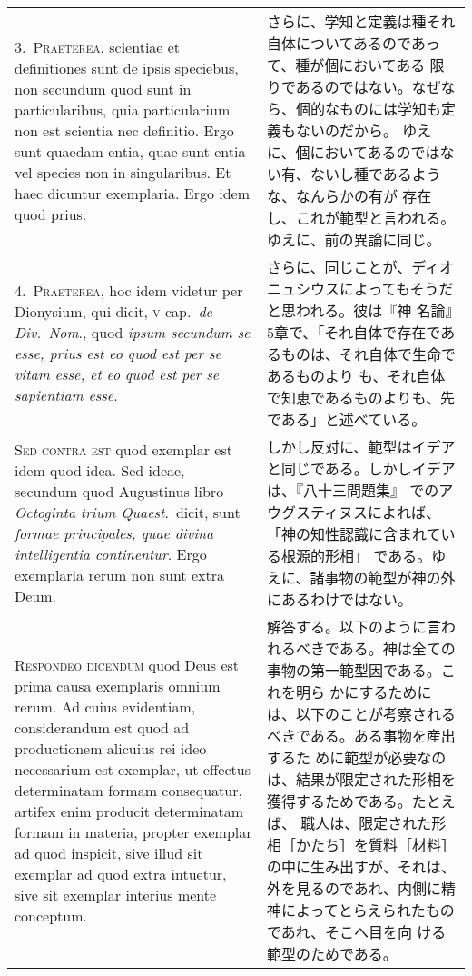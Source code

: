 \documentclass[10pt]{jsarticle} %
\begin{document}
\begin{longtable}{p{21em}p{21em}}
\\


3.~{\scshape Praeterea}, scientiae et definitiones sunt
de ipsis speciebus, non secundum quod sunt in particularibus, quia
particularium non est scientia nec definitio. Ergo sunt quaedam entia,
quae sunt entia vel species non in singularibus. Et haec dicuntur
exemplaria. Ergo idem quod prius.


&

さらに、学知と定義は種それ自体についてあるのであって、種が個においてある
 限りであるのではない。なぜなら、個的なものには学知も定義もないのだから。
ゆえに、個においてあるのではない有、ないし種であるような、なんらかの有が
 存在し、これが範型と言われる。ゆえに、前の異論に同じ。
\\

4.~{\scshape Praeterea}, hoc idem videtur per Dionysium, qui dicit,
{\scshape v} cap.~{\itshape de Div.~Nom}., quod {\itshape ipsum secundum
se esse, prius est eo quod est per se vitam esse, et eo quod est per se
sapientiam esse}.

&

さらに、同じことが、ディオニュシウスによってもそうだと思われる。彼は『神
 名論』5章で、「それ自体で存在であるものは、それ自体で生命であるものより
 も、それ自体で知恵であるものよりも、先である」と述べている。
\\

{\scshape Sed contra est} quod exemplar est idem quod idea. Sed ideae,
secundum quod Augustinus libro {\itshape Octoginta trium Quaest}.~dicit,
sunt {\itshape formae principales, quae divina intelligentia
continentur}. Ergo exemplaria rerum non sunt extra Deum.

&
しかし反対に、範型はイデアと同じである。しかしイデアは、『八十三問題集』
 でのアウグスティヌスによれば、「神の知性認識に含まれている根源的形相」
 である。ゆえに、諸事物の範型が神の外にあるわけではない。

\\


{\scshape Respondeo dicendum} quod Deus est prima causa exemplaris
omnium rerum. Ad cuius evidentiam, considerandum est quod ad
productionem alicuius rei ideo necessarium est exemplar, ut effectus
determinatam formam consequatur, artifex enim producit determinatam
formam in materia, propter exemplar ad quod inspicit, sive illud sit
exemplar ad quod extra intuetur, sive sit exemplar interius mente
conceptum. 

&

解答する。以下のように言われるべきである。神は全ての事物の第一範型因である。これを明ら
かにするためには、以下のことが考察されるべきである。ある事物を産出するた
めに範型が必要なのは、結果が限定された形相を獲得するためである。たとえば、
職人は、限定された形相［かたち］を質料［材料］の中に生み出すが、それは、
外を見るのであれ、内側に精神によってとらえられたものであれ、そこへ目を向
ける範型のためである。


\end{longtable}
\end{document}
